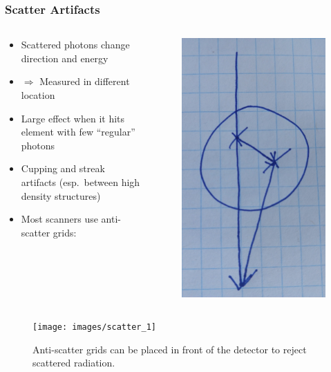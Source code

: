 	\begin{frame}
	\frametitle{Scatter Artifacts}
	\begin{columns}[c, onlytextwidth]
		\begin{column}{0.75\textwidth}
		\begin{itemize}
			\item Scattered photons change direction and energy
			\item[ ] $\Rightarrow$ Measured in different location
			\item Large effect when it hits element with few ``regular'' photons

			\item Cupping and streak artifacts (esp.\ between high density structures)
			\item Most scanners use anti-scatter grids:
		\end{itemize}
		\end{column}
		\begin{column}{0.25\textwidth}
		 \begin{figure}
			\centering
			\includegraphics[height=0.75\textwidth]{images/scatter_sketch}
		 \end{figure}
	\end{column}
	\end{columns}

	\begin{figure}
		\centering
		\texttt{[image: images/scatter\_1]}
		\caption{Anti-scatter grids can be placed in front of the detector to reject scattered radiation.}
		\label{fig:ct_scatter_1}
	\end{figure}

\end{frame}

